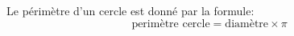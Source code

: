 Le périmètre d'un cercle est donné par la formule:
$$\text{perimètre cercle}=\text{diamètre}\times\pi$$